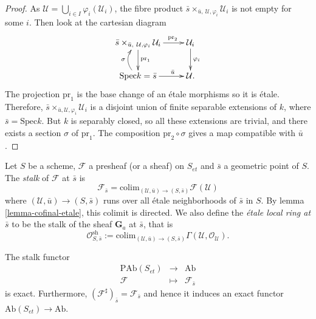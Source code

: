 \begin{proof}
As $\mathcal{U} = \bigcup_{i\in I}\varphi_i(\mathcal{U}_i)$, the fibre product 
$\bar s \times_{\bar u, \ \mathcal{U}, \varphi_i} \mathcal{U}_i$ is not empty 
for some $i$. Then look at the cartesian diagram
$$
\xymatrix{ 
{\bar s \times_{\bar u, \ \mathcal{U}, \varphi_i} \mathcal{U}_i} 
\ar^{\text{pr}_1}[d] \ar^{\qquad \text{pr}_2}[r] & {\mathcal{U}_i} 
\ar^{\varphi_i}[d] \\ 
{\text{Spec} k = \bar s} \ar@/^1pc/^{\sigma}[u] \ar^{\qquad \bar u}[r] & 
{\mathcal{U}.} 
}
$$
The projection $\text{pr}_1$ is the base change of an \'etale morphisms so it 
is \'etale. Therefore, $\bar s \times_{\bar u , \mathcal{U}, \varphi_i} 
\mathcal{U}_i$ is a disjoint union of finite separable extensions of $k$, where 
$\bar s = \text{Spec} k$. But $k$ is separably closed, so all these extensions 
are trivial, and there exists a section $\sigma$ of $\text{pr}_1$. The 
composition 
$\text{pr}_2 \circ \sigma$ gives a map compatible with $\bar u$.
\end{proof}

\begin{definition}
\label{definition-etale-local-rings}
Let $S$ be a scheme, $\mathcal{F}$ a presheaf (or a sheaf) on $S_{et}$ and 
$\bar s$ a geometric point of $S$. The {\it stalk} of $\mathcal{F}$ at $\bar 
s$ is  
$$
\mathcal{F}_{\bar s} = \text{colim}_{(\mathcal{U}, \bar u) \to (S,\bar s)} 
\mathcal{F}(\mathcal{U}) 
$$
where $(\mathcal{U}, \bar u) \to (S,\bar s)$ runs over all \'etale 
neighborhoods of $\bar s$ in $S$. By lemma \ref{lemma-cofinal-etale}, 
this colimit is directed. We also define the {\it \'etale local ring at $\bar 
s$} to be the stalk of the sheaf $\mathbf{G}_a$ at $\bar s$, that is
$$
\mathcal{O}_{S, \bar{s}}^\text{sh} := \text{colim}_{(\mathcal{U}, \bar u) \to 
(S,\bar s)} \Gamma(\mathcal{U}, \mathcal{O}_\mathcal{U}).
$$
\end{definition}

\begin{lemma}
\label{lemma-stalk-exact}
The stalk functor 
$$
\begin{matrix}
\text{PAb}(S_{et}) & \longrightarrow & \text{Ab}\\ 
\mathcal{F} & \longmapsto & \mathcal{F}_{\bar s}
\end{matrix}
$$ 
is exact. Furthermore, $\left(\mathcal{F}^\sharp\right)_{\bar s} = 
\mathcal{F}_{\bar s}$ and hence it induces an exact functor 
$\text{Ab}(S_{et})\to \text{Ab}$.
\end{lemma}

